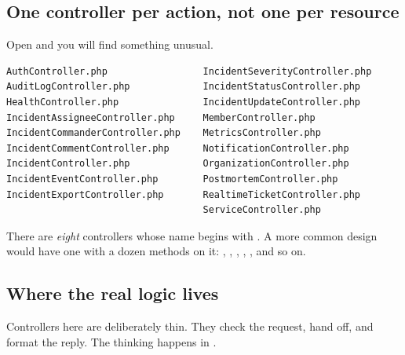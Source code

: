 \subsection{One controller per action, not one per resource}

Open  and you will find something unusual.

\begin{lstlisting}
AuthController.php                 IncidentSeverityController.php
AuditLogController.php             IncidentStatusController.php
HealthController.php               IncidentUpdateController.php
IncidentAssigneeController.php     MemberController.php
IncidentCommanderController.php    MetricsController.php
IncidentCommentController.php      NotificationController.php
IncidentController.php             OrganizationController.php
IncidentEventController.php        PostmortemController.php
IncidentExportController.php       RealtimeTicketController.php
                                   ServiceController.php
\end{lstlisting}

There are \emph{eight} controllers whose name begins with . A
more common design would have one  with a dozen
methods on it: , , ,
, , and so on.


\subsection{Where the real logic lives}

Controllers here are deliberately thin. They check the request, hand off, and
format the reply. The thinking happens in .

